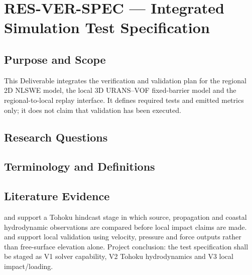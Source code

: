 
\section{RES-VER-SPEC --- Integrated Simulation Test Specification}
\label{sec:res-ver-spec}

\subsection{Purpose and Scope}
\label{sec:res-ver-spec-purpose}

This Deliverable integrates the verification and validation plan for
the regional 2D NLSWE model, the local 3D URANS--VOF fixed-barrier
model and the regional-to-local replay interface. It defines required
tests and emitted metrics only; it does not claim that validation has
been executed.

\subsection{Research Questions}
\label{sec:res-ver-spec-research-questions}


\subsection{Terminology and Definitions}
\label{sec:res-ver-spec-definitions}


\subsection{Literature Evidence}
\label{sec:res-ver-spec-literature-evidence}

\textcite{grilli2013tohoku} and \textcite{wei2013japan} support a
Tohoku hindcast stage in which source, propagation and coastal
hydrodynamic observations are compared before local impact claims are
made. \textcite{qin2018comparison} and \textcite{watanabe2022validation}
support local validation using velocity, pressure and force outputs
rather than free-surface elevation alone. Project conclusion: the
test specification shall be staged as V1 solver capability, V2 Tohoku
hydrodynamics and V3 local impact/loading.

